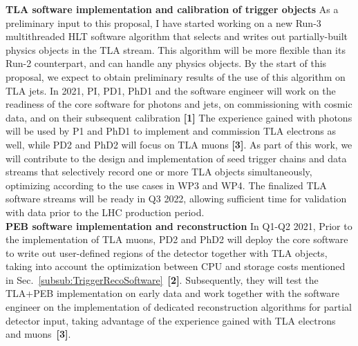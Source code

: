 \textbf{TLA software implementation and calibration of trigger objects} As a preliminary input to this proposal, I have started working on a new Run-3 multithreaded HLT software algorithm that selects and writes out partially-built physics objects in the TLA stream. 
This algorithm will be more flexible than its Run-2 counterpart, and can handle any physics objects. 
By the start of this proposal, we expect to obtain preliminary results of the use of this algorithm on TLA jets. 
In 2021, PI, PD1, PhD1 and the software engineer
will work on the readiness of the core software for photons and jets, on commissioning with cosmic data, and on their subsequent calibration \textbf{[1]}
The experience gained with photons will be used by P1 and PhD1 to implement and commission TLA electrons as well, while PD2 and PhD2 will focus on TLA muons \textbf{[3]}. 
As part of this work, we will contribute to the design and implementation of seed trigger chains and data streams that selectively record one or more TLA objects simultaneously, optimizing according to the use cases in WP3 and WP4. 
The finalized TLA software streams will be ready in Q3 2022, allowing sufficient time for validation with data prior to the LHC production period. \\
\textbf{PEB software implementation and reconstruction} In Q1-Q2 2021, Prior to the implementation of TLA muons, PD2 and PhD2 will deploy the core software to write out user-defined regions of the detector together with TLA objects, 
taking into account the optimization between CPU and storage costs mentioned in Sec.~\ref{subsub:TriggerRecoSoftware}~\textbf{[2]}. 
Subsequently, they will test the TLA+PEB implementation on early data and work together with the software engineer on the implementation of dedicated reconstruction algorithms for partial detector input, taking advantage of the experience gained with TLA electrons and muons~\textbf{[3]}. 

